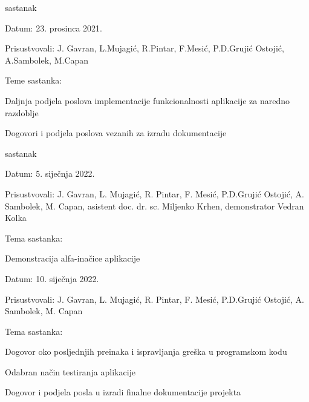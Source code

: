 \begin{packed_enum}
    		\item sastanak
    	\item[] \begin{packed_item}
    		\item Datum: 23. prosinca 2021.
    		\item Prisustvovali: J. Gavran, L.Mujagić, R.Pintar, F.Mesić, P.D.Grujić Ostojić, A.Sambolek, M.Capan
    		\item Teme sastanka:
    		\begin{packed_item}
    			\item Daljnja podjela poslova implementacije funkcionalnosti aplikacije za naredno razdoblje
    			\item Dogovori i podjela poslova vezanih za izradu dokumentacije
    		\end{packed_item}
    	\end{packed_item}
    
    		\item sastanak
    	\item[] \begin{packed_item}
    		\item Datum: 5. siječnja 2022.
    		\item Prisustvovali: J. Gavran, L. Mujagić, R. Pintar, F. Mesić, P.D.Grujić Ostojić, A. Sambolek, M. Capan, asistent doc. dr. sc. Miljenko Krhen, demonstrator Vedran Kolka
    		\item Tema sastanka:
    		\begin{packed_item}
    			\item Demonstracija alfa-inačice aplikacije
    		\end{packed_item}
    	\end{packed_item}

	\item[] \begin{packed_item}
    		\item Datum: 10. siječnja 2022.
    		\item Prisustvovali: J. Gavran, L. Mujagić, R. Pintar, F. Mesić, P.D.Grujić Ostojić, A. Sambolek, M. Capan
    		\item Tema sastanka:
    		\begin{packed_item}
    			\item Dogovor oko posljednjih preinaka i ispravljanja greška u programskom kodu
    			\item Odabran način testiranja aplikacije
    			\item  Dogovor i podjela posla u izradi finalne dokumentacije projekta
    		\end{packed_item}
    	\end{packed_item}

		\end{packed_enum}	
		
